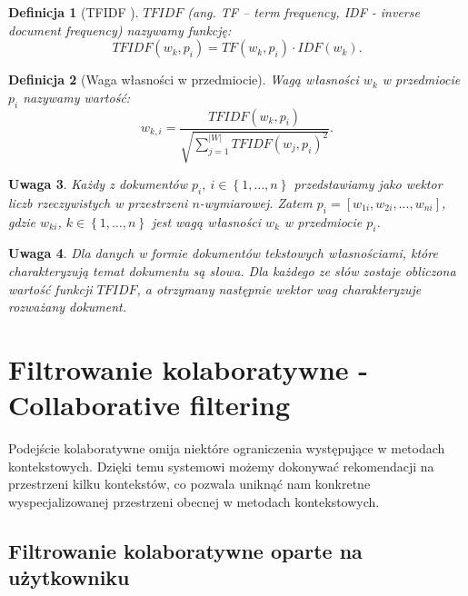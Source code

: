 \documentclass[12pt,a4paper]{report}
\newtheorem{df}{Definicja}[chapter]
\newtheorem{uwaga}[df]{Uwaga}
\newcommand{\set}[1]{\left\lbrace {#1} \right\rbrace}
\begin{document}
\begin{df}[TFIDF {\citep[Sec 3.3.1.1]{rsh}}]
$TFIDF$ (ang. \textit{TF – term frequency, IDF - inverse document frequency}) nazywamy funkcję:
$$
TFIDF(w_k, p_i) = TF(w_k, p_i) \cdot IDF(w_k).
$$
\end{df}

\begin{df}[Waga własności w przedmiocie]
Wagą własności $w_k$ w przedmiocie $p_i$ nazywamy wartość:
$$
w_{k,i} = \frac{TFIDF(w_k, p_i)}{\sqrt{ \sum_{j=1}^{|W|}{TFIDF(w_j, p_i)}^2}}.
$$
\end{df}

\begin{uwaga}
Każdy z dokumentów $p_i, \: i\in\set{1,\ldots,n} $ przedstawiamy jako wektor liczb rzeczywistych w przestrzeni $n$-wymiarowej. Zatem $ p_i = [w_{1i}, w_{2i},...,w_{ni}] $, gdzie $w_{ki}$, $k \in \set{1, \ldots, n}$ jest wagą własności $w_k$ w przedmiocie $p_i$.
\end{uwaga}

\begin{uwaga}
Dla danych w formie dokumentów tekstowych własnościami, które charakteryzują temat dokumentu są słowa. Dla każdego ze słów zostaje obliczona wartość funkcji $TFIDF$, a otrzymany następnie wektor wag charakteryzuje rozważany dokument.
\end{uwaga}

\section{Filtrowanie kolaboratywne - Collaborative filtering}
Podejście kolaboratywne omija niektóre ograniczenia występujące w metodach kontekstowych. Dzięki temu systemowi możemy dokonywać rekomendacji na przestrzeni kilku kontekstów, co pozwala uniknąć nam konkretne wyspecjalizowanej przestrzeni obecnej w metodach kontekstowych.

\subsection{Filtrowanie kolaboratywne oparte na użytkowniku}
\end{document}
